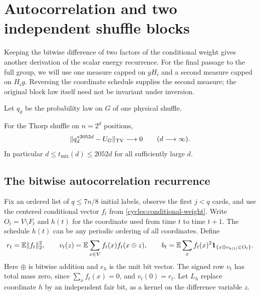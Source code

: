\section{Autocorrelation and two independent shuffle blocks}
\label{cycles:autocorrelation-section}

Keeping the bitwise difference of two factors of the conditional weight
gives another derivation of the scalar energy recurrence. For the final passage to the
full group, we will use one measure capped on $gH_i$ and a second measure
capped on $H_ig$. Reversing the coordinate schedule supplies the second
measure; the original block law itself need not be invariant under
inversion.

Let $q_d$ be the probability law on $G$ of one physical shuffle.

\begin{theorem}
\label{cycles:sharp}
For the Thorp shuffle on $n=2^d$ positions,
\[
 \|q_d^{*2052d}-U_G\|_{\mathrm{TV}}\longrightarrow0
 \qquad(d\longrightarrow\infty).
\]
In particular $d\le t_{\mathrm{mix}}(d)\le2052d$ for all sufficiently
large $d$.
\end{theorem}

\subsection{The bitwise autocorrelation recurrence}
\label{cycles:autocorrelation}

Fix an ordered list of $q\le7n/8$ initial labels, observe the first
$j<q$ cards, and use the centered conditional vector $f_t$ from
\eqref{cycles:conditional-weight}. Write $O_t=V\setminus F_t$ and
$h(t)$ for the coordinate used from time $t$ to time $t+1$.
The schedule $h(t)$ can be any periodic ordering of all coordinates.
Define
\begin{equation}\label{cycles:autocorrelation-definition}
 r_t=\mathbb E\|f_t\|_2^2,\qquad
 v_t(z)=\mathbb E\sum_{x\in V}f_t(x)f_t(x\oplus z),\qquad
 b_t=\mathbb E\sum_xf_t(x)^2\mathbf 1_{\{x\oplus e_{h(t)}\in O_t\}}.
\end{equation}
Here $\oplus$ is bitwise addition and $e_h$ is the unit bit vector.
The signed row $v_t$ has total mass zero, since $\sum_xf_t(x)=0$,
and $v_t(0)=r_t$. Let $L_h$ replace coordinate $h$ by an independent
fair bit, as a kernel on the difference variable $z$.

